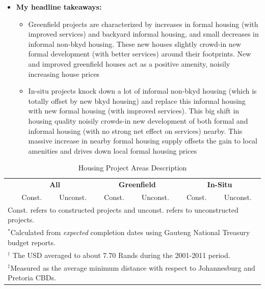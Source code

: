 \documentclass[12pt]{article}
\begin{document}
\begin{itemize}
\item \textbf{My headline takeaways:}
\begin{itemize}
	\item Greenfield projects are characterized by increases in formal housing (with improved services) and backyard informal housing, and small decreases in informal non-bkyd housing.  These new houses slightly crowd-in new formal development (with better services) around their footprints.  New and improved greenfield houses act as a positive amenity, noisily increasing house prices
	\item In-situ projects knock down a lot of informal non-bkyd housing (which is totally offset by new bkyd housing) and replace this informal housing with new formal housing (with improved services).  This big shift in housing quality noisily crowds-in new development of both formal and informal housing (with no strong net effect on services) nearby.  This massive increase in nearby formal housing supply offsets the gain to local amenities and drives down local formal housing prices 
\end{itemize}


\end{itemize}




\vspace{0mm}
\begin{table}[h!]
\centering
\caption{Housing Project Areas Description}\label{table:projectdescriptives}
\vspace{0mm}
\begin{tabular}{l*{1}{cccccc}}
\toprule
  & \multicolumn{2}{c}{\textbf{All}}& \multicolumn{2}{c}{\textbf{Greenfield}}  & \multicolumn{2}{c}{\textbf{In-Situ}}   \\
  &Const. & Unconst. &Const. & Unconst.   & Const. & Unconst. \\
\midrule

\bottomrule
\multicolumn{7}{l}{\scriptsize Const. refers to constructed projects and unconst. refers to unconstructed projects.}\\[-.5em]
\multicolumn{7}{l}{\scriptsize $^*$Calculated from {\it expected} completion dates using Gauteng National Treasury budget reports.}\\[-.5em]
\multicolumn{7}{l}{\scriptsize $^\dagger$ The USD averaged to about 7.70 Rands during the 2001-2011 period.}\\[-.5em]
\multicolumn{7}{l}{\scriptsize $^\ddagger$Measured as the average minimum distance with respect to Johannesburg and Pretoria CBDs. } \\[-.5em]
\end{tabular}
\end{table} 
\end{document}
